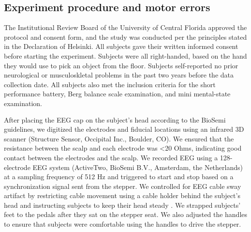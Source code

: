 \documentclass[shortpaper,twoside,web]{ieeecolor}
\begin{document}
\subsection{Experiment procedure and motor errors}
The Institutional Review Board of the University of Central Florida approved the protocol and consent form, and the study was conducted per the principles stated in the Declaration of Helsinki. All subjects gave their written informed consent before starting the experiment. Subjects were all right-handed, based on the hand they would use to pick an object from the floor. Subjects self-reported no prior neurological or musculoskletal problems in the past two years before the data collection date. All subjects also met the inclusion criteria for the short performance battery, Berg balance scale examination, and mini mental-state examination.

After placing the EEG cap on the subject’s head according to the BioSemi guidelines, we digitized the electrodes and fiducial locations using an infrared 3D scanner (Structure Sensor, Occipital Inc., Boulder, CO). We ensured that the resistance between the scalp and each electrode was <20 Ohms, indicating good contact between the electrodes and the scalp. We recorded EEG using a 128-electrode EEG system (ActiveTwo, BioSemi B.V., Amsterdam, the Netherlands) at a sampling frequency of 512 Hz and triggered to start and stop based on a synchronization signal sent from the stepper. We controlled for EEG cable sway artifact by restricting cable movement using a cable holder behind the subject’s head and instructing subjects to keep their head steady \cite{Symeonidou2018-ge}. We strapped subjects' feet to the pedals after they sat on the stepper seat. We also adjusted the handles to ensure that subjects were comfortable using the handles to drive the stepper.
\end{document}
